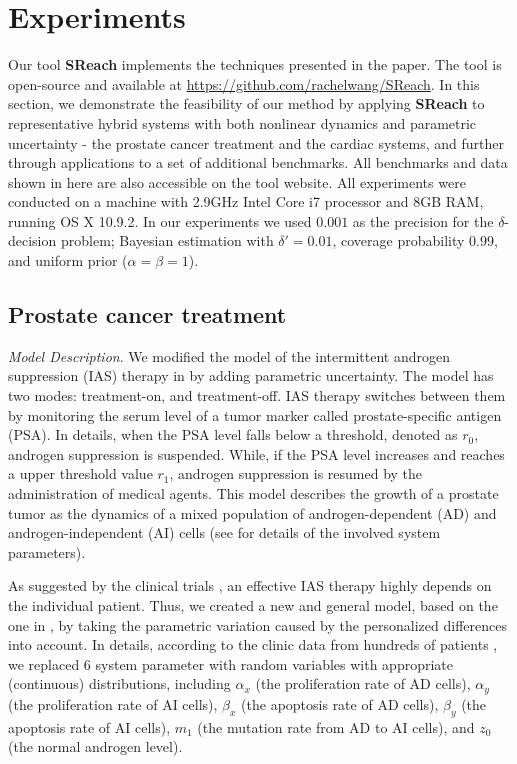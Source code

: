 \section{Experiments}

Our tool {\bf SReach} implements the techniques presented in the paper. The tool is open-source and 
available at \url{https://github.com/rachelwang/SReach}. In this section, we demonstrate the feasibility of our method by applying {\bf SReach} to representative hybrid systems with both nonlinear dynamics and parametric uncertainty - the prostate cancer treatment and the cardiac systems, and further through applications to a set of additional benchmarks. All benchmarks and data shown in here are also accessible on the tool website. All experiments were conducted on a machine with 2.9GHz Intel Core i7 processor and 8GB RAM, running OS X 10.9.2. 
In our experiments we used $0.001$ as the precision for the $\delta$-decision problem; Bayesian estimation
with $\delta' = 0.01$, coverage probability $0.99$, and uniform prior ($\alpha = \beta = 1$). 


\subsection{Prostate cancer treatment}

\textit{Model Description}.
We modified the model of the intermittent androgen suppression (IAS) therapy in \cite{tanaka2010mathematical} by adding parametric uncertainty. The model has two modes: treatment-on, and treatment-off. IAS therapy switches between them by monitoring the serum level of a tumor marker called prostate-specific antigen (PSA). In details, when the PSA level falls below a threshold, denoted as $r_0$, androgen suppression is suspended. While, if the PSA level increases and reaches a upper threshold value $r_1$, androgen suppression is resumed by the administration of medical agents. This model describes the growth of a prostate tumor as the dynamics of a mixed population of androgen-dependent (AD) and androgen-independent (AI) cells (see \cite{tanaka2010mathematical} for details of the involved system parameters). 

As suggested by the clinical trials \cite{bruchovsky2006final}, an effective IAS therapy highly depends on the individual patient. Thus, we created a new and general model, based on the one in \cite{tanaka2010mathematical},  by taking the parametric variation caused by the personalized differences into account. In details, according to the clinic data from hundreds of patients \cite{bruchovsky2007locally}, we replaced 6 system parameter with random variables with appropriate (continuous) distributions, including $\alpha_x$ (the proliferation rate of AD cells), $\alpha_y$ (the proliferation rate of AI cells), $\beta_x$ (the apoptosis rate of AD cells), $\beta_y$ (the apoptosis rate of AI cells), $m_1$ (the mutation rate from AD to AI cells), and $z_0$ (the normal androgen level).

